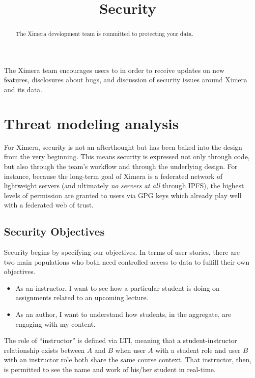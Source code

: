 \documentclass{ximera}
\title{Security}
\begin{document}
\begin{abstract}
  The Ximera development team is committed to protecting your data.
\end{abstract}
\maketitle

The Ximera team encourages users to  in order to receive
updates on new features, disclosures about bugs, and discussion of
security issues around Ximera and its data.

\section{Threat modeling analysis}

For Ximera, security is not an afterthought but has been baked into
the design from the very beginning.  This means security is expressed
not only through code, but also through the team's workflow and
through the underlying design.  For instance, because the long-term
goal of Ximera is a federated network of lightweight servers (and
ultimately \textit{no servers at all} through IPFS), the highest
levels of permission are granted to users via GPG keys which already
play well with a federated web of trust.

\subsection{Security Objectives}

Security begins by specifying our objectives.  In terms of user
stories, there are two main populations who both need controlled
access to data to fulfill their own objectives.
\begin{itemize}
\item As an instructor, I want to see how a particular student is
  doing on assignments related to an upcoming lecture.
\item As an author, I want to understand how students, in the
  aggregate, are engaging with my content.
\end{itemize}
The role of ``instructor'' is defined via LTI, meaning that a
student-instructor relationship exists between $A$ and $B$ when user
$A$ with a student role and user $B$ with an instructor role both
share the same course context.  That instructor, then, is permitted to
see the name and work of his/her student in real-time.
\end{document}
